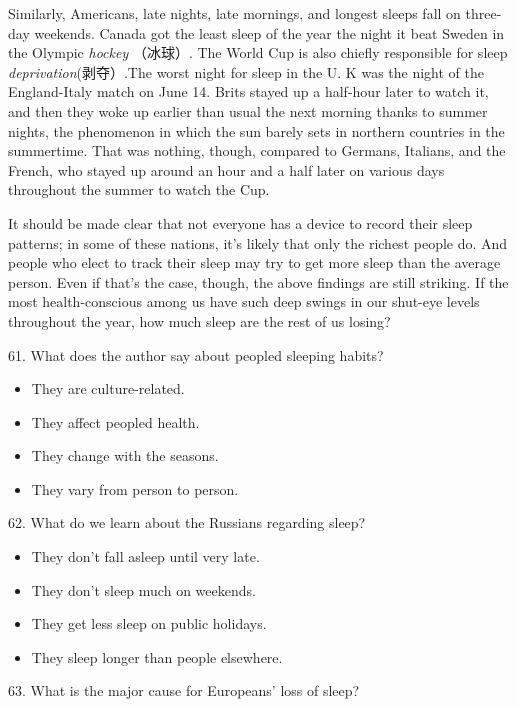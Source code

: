 \documentclass[UTF8,11pt]{ctexart}
\begin{document}
Similarly, Americans, late nights, late mornings, and longest sleeps fall on three-day weekends. Canada got the least sleep of the year the night it beat Sweden in the Olympic\textit{ hockey} （冰球）. The World Cup is also chiefly responsible for sleep \textit{deprivation}(剥夺）.The worst night for sleep in the U. K was the night of the England-Italy match on June 14. Brits stayed up a half-hour later to watch it, and then they woke up earlier than usual the next morning thanks to summer nights, the phenomenon in which the sun barely sets in northern countries in the summertime. That was nothing, though, compared to Germans, Italians, and the French, who stayed up around an hour and a half later on various days throughout the summer to watch the Cup.


It should be made clear that not everyone has a device to record their sleep patterns; in some of these nations, it’s likely that only the richest people do. And people who elect to track their sleep may try to get more sleep than the average person. Even if that’s the case, though, the above findings are still striking. If the most health-conscious among us have such deep swings in our shut-eye levels throughout the year, how much sleep are the rest of us losing?


61. What does the author say about peopled sleeping habits?


\begin{itemize}[leftmargin=2em,itemsep=.2em,topsep=.4em]\item[A.] They are culture-related.
\item[B.] They affect peopled health.
\item[C.] They change with the seasons.
\item[D.] They vary from person to person.
\end{itemize}

62. What do we learn about the Russians regarding sleep?


\begin{itemize}[leftmargin=2em,itemsep=.2em,topsep=.4em]\item[A.] They don’t fall asleep until very late.
\item[B.] They don’t sleep much on weekends.
\item[C.] They get less sleep on public holidays.
\item[D.] They sleep longer than people elsewhere.
\end{itemize}

63. What is the major cause for Europeans’ loss of sleep?
\end{document}
